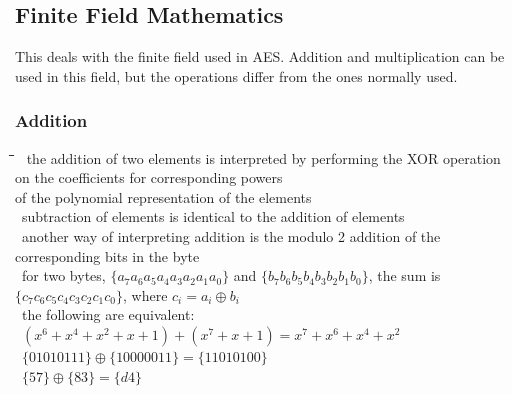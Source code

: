 \documentclass[10pt,letterpaper]{scrartcl}
\newcommand{\tbul}{\textbullet}
\newcommand{\tend}{\>\textendash}
\newcommand{\tasc}{\>\>\textasteriskcentered}
\newcommand{\tabDef}{\hspace{2em}\=\hspace{2em}\=\hspace{2em}\=\hspace{2em}\=\kill}
\begin{document}
\subsection{Finite Field Mathematics}
This deals with the finite field used in AES. Addition and multiplication can be used in this field, but the operations differ from the ones normally used. 
\subsubsection*{Addition}\begin{tabbing}\tabDef
\tbul\ the addition of two elements is interpreted by performing the XOR operation on the coefficients for corresponding powers \\ of the polynomial representation of the elements \\
\tbul\ subtraction of elements is identical to the addition of elements \\
\tbul\ another way of interpreting addition is the modulo 2 addition of the corresponding bits in the byte \\
    \tend\ for two bytes, $\{a_7a_6a_5a_4a_3a_2a_1a_0\}$ and $\{b_7b_6b_5b_4b_3b_2b_1b_0\}$, the sum is $\{c_7c_6c_5c_4c_3c_2c_1c_0\}$, where $c_i = a_i \oplus b_i$ \\
    \tend\ the following are equivalent: \\
        \tasc\ $(x^6+x^4+x^2+x+1)+(x^7+x+1)=x^7+x^6+x^4+x^2$\\
        \tasc\ $\{01010111\}\oplus \{10000011\}=\{11010100\}$ \\
        \tasc\ $\{57\}\oplus \{83\}=\{d4\}$\end{tabbing}
\end{document}
